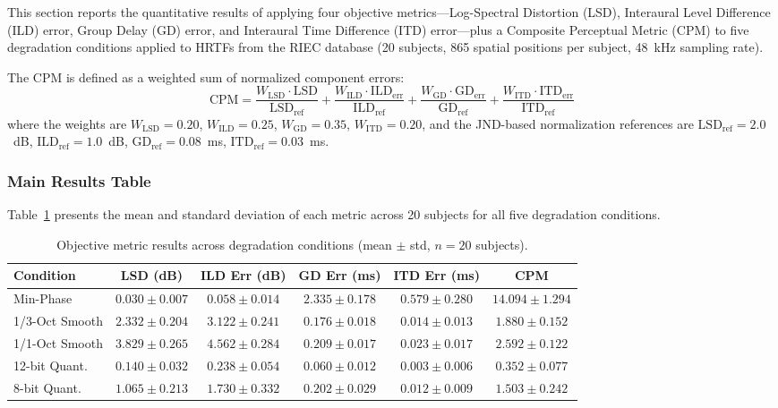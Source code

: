\documentclass[12pt,a4paper]{article}
\begin{document}
This section reports the quantitative results of applying four objective metrics---Log-Spectral Distortion (LSD), Interaural Level Difference (ILD) error, Group Delay (GD) error, and Interaural Time Difference (ITD) error---plus a Composite Perceptual Metric (CPM) to five degradation conditions applied to HRTFs from the RIEC database (20 subjects, 865 spatial positions per subject, 48~kHz sampling rate).

The CPM is defined as a weighted sum of normalized component errors:
\begin{equation}
\mathrm{CPM} = \frac{W_{\mathrm{LSD}} \cdot \mathrm{LSD}}{\mathrm{LSD}_{\mathrm{ref}}} + \frac{W_{\mathrm{ILD}} \cdot \mathrm{ILD}_{\mathrm{err}}}{\mathrm{ILD}_{\mathrm{ref}}} + \frac{W_{\mathrm{GD}} \cdot \mathrm{GD}_{\mathrm{err}}}{\mathrm{GD}_{\mathrm{ref}}} + \frac{W_{\mathrm{ITD}} \cdot \mathrm{ITD}_{\mathrm{err}}}{\mathrm{ITD}_{\mathrm{ref}}}
\label{eq:cpm}
\end{equation}
where the weights are $W_{\mathrm{LSD}} = 0.20$, $W_{\mathrm{ILD}} = 0.25$, $W_{\mathrm{GD}} = 0.35$, $W_{\mathrm{ITD}} = 0.20$, and the JND-based normalization references are $\mathrm{LSD}_{\mathrm{ref}} = 2.0$~dB, $\mathrm{ILD}_{\mathrm{ref}} = 1.0$~dB, $\mathrm{GD}_{\mathrm{ref}} = 0.08$~ms, $\mathrm{ITD}_{\mathrm{ref}} = 0.03$~ms.

\subsubsection*{Main Results Table}

Table~\ref{tab:results} presents the mean and standard deviation of each metric across 20 subjects for all five degradation conditions.

\begin{table}[h!]
\centering
\caption{Objective metric results across degradation conditions (mean $\pm$ std, $n = 20$ subjects).}
\label{tab:results}
\begin{tabular}{lccccc}
\toprule
\textbf{Condition} & \textbf{LSD (dB)} & \textbf{ILD Err (dB)} & \textbf{GD Err (ms)} & \textbf{ITD Err (ms)} & \textbf{CPM} \\
\midrule
Min-Phase        & $0.030 \pm 0.007$ & $0.058 \pm 0.014$ & $2.335 \pm 0.178$ & $0.579 \pm 0.280$ & $\mathbf{14.094 \pm 1.294}$ \\
1/3-Oct Smooth   & $2.332 \pm 0.204$ & $3.122 \pm 0.241$ & $0.176 \pm 0.018$ & $0.014 \pm 0.013$ & $1.880 \pm 0.152$ \\
1/1-Oct Smooth   & $3.829 \pm 0.265$ & $4.562 \pm 0.284$ & $0.209 \pm 0.017$ & $0.023 \pm 0.017$ & $2.592 \pm 0.122$ \\
12-bit Quant.    & $0.140 \pm 0.032$ & $0.238 \pm 0.054$ & $0.060 \pm 0.012$ & $0.003 \pm 0.006$ & $0.352 \pm 0.077$ \\
8-bit Quant.     & $1.065 \pm 0.213$ & $1.730 \pm 0.332$ & $0.202 \pm 0.029$ & $0.012 \pm 0.009$ & $1.503 \pm 0.242$ \\
\bottomrule
\end{tabular}
\end{table}
\end{document}
